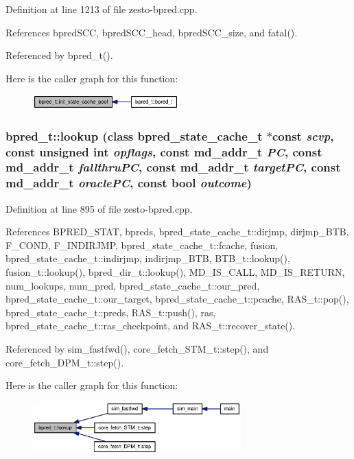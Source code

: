Definition at line 1213 of file zesto-bpred.cpp.

References bpredSCC, bpredSCC\_\-head, bpredSCC\_\-size, and fatal().

Referenced by bpred\_\-t().

Here is the caller graph for this function:\nopagebreak
\begin{figure}[H]
\begin{center}
\leavevmode
\includegraphics[width=159pt]{classbpred__t_20daf02e6bf98c4ab5ee282b22e735c3_icgraph}
\end{center}
\end{figure}
\subsubsection[{lookup}]{ bpred\_\-t::lookup (class {\bf bpred\_\-state\_\-cache\_\-t} $\ast$const  {\em scvp}, \/  const unsigned int {\em opflags}, \/  const {\bf md\_\-addr\_\-t} {\em PC}, \/  const {\bf md\_\-addr\_\-t} {\em fallthruPC}, \/  const {\bf md\_\-addr\_\-t} {\em targetPC}, \/  const {\bf md\_\-addr\_\-t} {\em oraclePC}, \/  const bool {\em outcome})}\label{classbpred__t_eb9b5d4a17fb1fb8ea0055de44874d4e}




Definition at line 895 of file zesto-bpred.cpp.

References BPRED\_\-STAT, bpreds, bpred\_\-state\_\-cache\_\-t::dirjmp, dirjmp\_\-BTB, F\_\-COND, F\_\-INDIRJMP, bpred\_\-state\_\-cache\_\-t::fcache, fusion, bpred\_\-state\_\-cache\_\-t::indirjmp, indirjmp\_\-BTB, BTB\_\-t::lookup(), fusion\_\-t::lookup(), bpred\_\-dir\_\-t::lookup(), MD\_\-IS\_\-CALL, MD\_\-IS\_\-RETURN, num\_\-lookups, num\_\-pred, bpred\_\-state\_\-cache\_\-t::our\_\-pred, bpred\_\-state\_\-cache\_\-t::our\_\-target, bpred\_\-state\_\-cache\_\-t::pcache, RAS\_\-t::pop(), bpred\_\-state\_\-cache\_\-t::preds, RAS\_\-t::push(), ras, bpred\_\-state\_\-cache\_\-t::ras\_\-checkpoint, and RAS\_\-t::recover\_\-state().

Referenced by sim\_\-fastfwd(), core\_\-fetch\_\-STM\_\-t::step(), and core\_\-fetch\_\-DPM\_\-t::step().

Here is the caller graph for this function:\nopagebreak
\begin{figure}[H]
\begin{center}
\leavevmode
\includegraphics[width=227pt]{classbpred__t_eb9b5d4a17fb1fb8ea0055de44874d4e_icgraph}
\end{center}
\end{figure}
